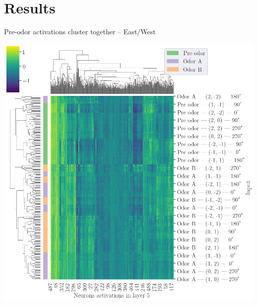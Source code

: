 \documentclass[bigger]{beamer}
\begin{document}
\section{Results}
\label{sec:orgcd9d909}
\begin{frame}[label={sec:org813d123}]{Pre-odor activations cluster together -- East/West}
\begin{center}
\includegraphics[height=0.9\textheight]{medias/activations-learned-EastWest.png}
\end{center}
\end{frame}
\end{document}
